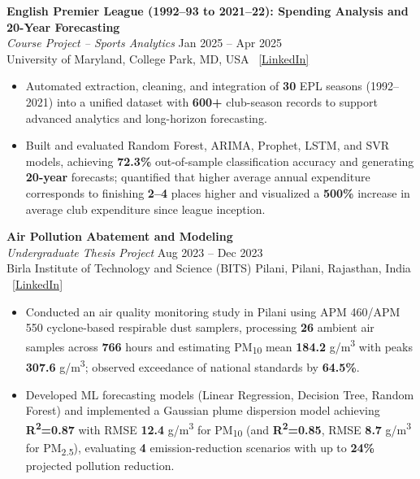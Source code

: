 \documentclass[11pt,letterpaper]{article}
\begin{document}
\vspace{6pt}
\textbf{English Premier League (1992--93 to 2021--22): Spending Analysis and 20-Year Forecasting}\\
\textit{Course Project -- Sports Analytics} \hfill Jan 2025 -- Apr 2025\\
University of Maryland, College Park, MD, USA \textbar\ \href{https://www.linkedin.com/in/namit-shrivastava-baab47204/details/projects/}{[LinkedIn]}
\begin{itemize}[leftmargin=16pt, noitemsep, topsep=2pt]
    \item Automated extraction, cleaning, and integration of \textbf{30} EPL seasons (1992--2021) into a unified dataset with \textbf{600+} club-season records to support advanced analytics and long-horizon forecasting.
    \item Built and evaluated Random Forest, ARIMA, Prophet, LSTM, and SVR models, achieving \textbf{72.3\%} out-of-sample classification accuracy and generating \textbf{20-year} forecasts; quantified that higher average annual expenditure corresponds to finishing \textbf{2--4} places higher and visualized a \textbf{500\%} increase in average club expenditure since league inception.
\end{itemize}

\vspace{6pt}
\textbf{Air Pollution Abatement and Modeling}\\
\textit{Undergraduate Thesis Project} \hfill Aug 2023 -- Dec 2023\\
Birla Institute of Technology and Science (BITS) Pilani, Pilani, Rajasthan, India \textbar\ \href{https://www.linkedin.com/in/namit-shrivastava-baab47204/details/projects/}{[LinkedIn]}
\begin{itemize}[leftmargin=16pt, noitemsep, topsep=2pt]
    \item Conducted an air quality monitoring study in Pilani using APM 460/APM 550 cyclone-based respirable dust samplers, processing \textbf{26} ambient air samples across \textbf{766} hours and estimating PM\textsubscript{10} mean \textbf{184.2} \textmu g/m\textsuperscript{3} with peaks \textbf{307.6} \textmu g/m\textsuperscript{3}; observed exceedance of national standards by \textbf{64.5\%}.
    \item Developed ML forecasting models (Linear Regression, Decision Tree, Random Forest) and implemented a Gaussian plume dispersion model achieving \textbf{R\textsuperscript{2}=0.87} with RMSE \textbf{12.4} \textmu g/m\textsuperscript{3} for PM\textsubscript{10} (and \textbf{R\textsuperscript{2}=0.85}, RMSE \textbf{8.7} \textmu g/m\textsuperscript{3} for PM\textsubscript{2.5}), evaluating \textbf{4} emission-reduction scenarios with up to \textbf{24\%} projected pollution reduction.
\end{itemize}
\end{document}
